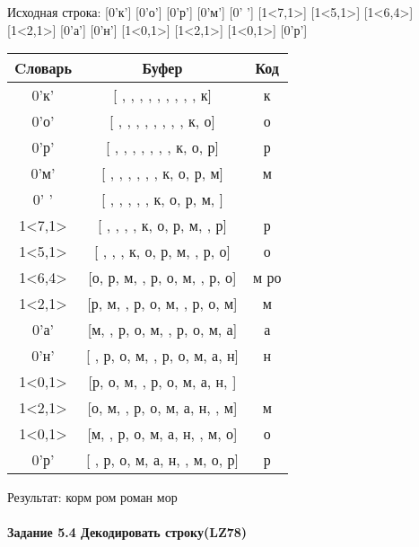 \documentclass[a4paper, 12pt]{article}
\begin{document}
Исходная строка: [0'к'] [0'о'] [0'р'] [0'м'] [0' '] [1<7,1>] [1<5,1>] [1<6,4>] [1<2,1>] [0'а'] [0'н'] [1<0,1>] [1<2,1>] [1<0,1>] [0'р']\\
\begin{table}[h!]
\centering
\begin{tabular}{|c|c|c|}
\hline
 Cловарь & Буфер & Код  \\ \hline
0'к' & [ ,  ,  ,  ,  ,  ,  ,  ,  , к] & к
\\ \hline
0'о' & [ ,  ,  ,  ,  ,  ,  ,  , к, о] & о
\\ \hline
0'р' & [ ,  ,  ,  ,  ,  ,  , к, о, р] & р
\\ \hline
0'м' & [ ,  ,  ,  ,  ,  , к, о, р, м] & м
\\ \hline
0' ' & [ ,  ,  ,  ,  , к, о, р, м,  ] &  
\\ \hline
1<7,1> & [ ,  ,  ,  , к, о, р, м,  , р] & р
\\ \hline
1<5,1> & [ ,  ,  , к, о, р, м,  , р, о] & о
\\ \hline
1<6,4> & [о, р, м,  , р, о, м,  , р, о] & м ро
\\ \hline
1<2,1> & [р, м,  , р, о, м,  , р, о, м] & м
\\ \hline
0'а' & [м,  , р, о, м,  , р, о, м, а] & а
\\ \hline
0'н' & [ , р, о, м,  , р, о, м, а, н] & н
\\ \hline
1<0,1> & [р, о, м,  , р, о, м, а, н,  ] &  
\\ \hline
1<2,1> & [о, м,  , р, о, м, а, н,  , м] & м
\\ \hline
1<0,1> & [м,  , р, о, м, а, н,  , м, о] & о
\\ \hline
0'р' & [ , р, о, м, а, н,  , м, о, р] & р
\\ \hline
\end{tabular}
\end{table}

Результат: корм ром роман мор
\pagebreak
\paragraph{Задание 5.4 Декодировать строку(LZ78)\\}
\end{document}
